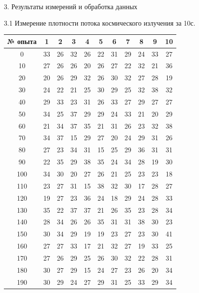 \documentclass[12pt, a4paper]{article}
\begin{document}
          {\Large 3. Результаты измерений и обработка данных \\}
          
          {\large 3.1 Измерение плотности потока космического излучения за 10с. \\}
          \begin{center}
            \begin{tabular}{ |c|c|c|c|c|c|c|c|c|c|c| } \hline
                № опыта & 1 & 2 & 3 & 4 & 5 & 6 & 7 & 8 & 9 & 10 \\ \hline
                0 & 33 & 26 & 32 & 26 & 22 & 31 & 29 & 24 & 33 & 27 \\ \hline
                10 & 27 & 26 & 26 & 20 & 26 & 27 & 22 & 32 & 21 & 36 \\ \hline
                20 & 20 & 26 & 29 & 32 & 26 & 30 & 32 & 27 & 28 & 19 \\ \hline
                30 & 24 & 22 & 21 & 25 & 30 & 29 & 25 & 32 & 38 & 32 \\ \hline
                40 & 29 & 33 & 23 & 31 & 26 & 33 & 27 & 29 & 27 & 27 \\ \hline
                50 & 34 & 25 & 37 & 29 & 29 & 24 & 33 & 21 & 20 & 29 \\ \hline
                60 & 21 & 34 & 37 & 35 & 21 & 31 & 26 & 23 & 32 & 38 \\ \hline
                70 & 34 & 37 & 15 & 29 & 27 & 20 & 24 & 29 & 31 & 26 \\ \hline
                80 & 27 & 23 & 34 & 31 & 15 & 25 & 29 & 36 & 31 & 31 \\ \hline
                90 & 22 & 35 & 29 & 38 & 35 & 24 & 34 & 28 & 19 & 30 \\ \hline
                100 & 34 & 30 & 20 & 27 & 26 & 21 & 25 & 23 & 23 & 18 \\ \hline
                110 & 23 & 27 & 31 & 15 & 38 & 32 & 30 & 17 & 28 & 27 \\ \hline
                120 & 19 & 27 & 23 & 36 & 24 & 18 & 29 & 24 & 28 & 33 \\ \hline
                130 & 35 & 22 & 37 & 37 & 21 & 26 & 35 & 23 & 28 & 34 \\ \hline
                140 & 28 & 34 & 26 & 26 & 35 & 31 & 31 & 38 & 30 & 23 \\ \hline
                150 & 30 & 34 & 29 & 19 & 19 & 23 & 27 & 23 & 30 & 41 \\ \hline
                160 & 27 & 27 & 33 & 17 & 21 & 32 & 27 & 19 & 33 & 25 \\ \hline
                170 & 27 & 26 & 29 & 25 & 26 & 30 & 32 & 22 & 28 & 31 \\ \hline
                180 & 30 & 27 & 29 & 15 & 24 & 27 & 23 & 26 & 20 & 34 \\ \hline
                190 & 30 & 29 & 24 & 27 & 29 & 31 & 25 & 33 & 29 & 34 \\ \hline
            \end{tabular}
            \end{center} 
            
\end{document}
